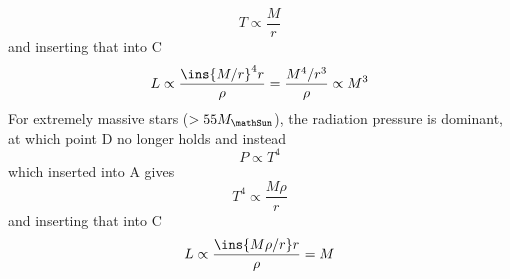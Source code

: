 \begin{equation}
	T \propto \frac{M}{r}
\end{equation}
and inserting that into C
\begin{equation}
	L\propto\frac{\ins{M/r}^4r}{\rho}=\frac{M^4/r^3}{\rho} \propto M^3
\end{equation}
For extremely massive stars ($>55M_\mathSun$), the radiation pressure is dominant, at which point D no longer holds and instead
\begin{equation}
	P \propto T^4
\end{equation}
which inserted into A gives
\begin{equation}
	T^4 \propto \frac{M\rho}{r}
\end{equation}
and inserting that into C
\begin{equation}
	L \propto \frac{\ins{M\rho/r}r}{\rho}=M
\end{equation}
